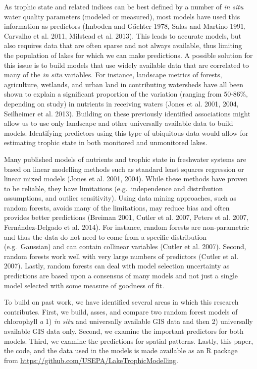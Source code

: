 \documentclass[11pt,]{article}
\begin{document}
As trophic state and related indices can be best defined by a number of
\emph{in situ} water quality parameters (modeled or measured), most
models have used this information as predictors (Imboden and G{ä}chter
1978, Salas and Martino 1991, Carvalho et al. 2011, Milstead et al.
2013). This leads to accurate models, but also requires data that are
often sparse and not always available, thus limiting the population of
lakes for which we can make predictions. A possible solution for this
issue is to build models that use widely available data that are
correlated to many of the \emph{in situ} variables. For instance,
landscape metrics of forests, agriculture, wetlands, and urban land in
contributing watersheds have all been shown to explain a significant
proportion of the variation (ranging from 50-86\%, depending on study)
in nutrients in receiving waters (Jones et al. 2001, 2004, Seilheimer et
al. 2013). Building on these previously identified associations might
allow us to use only landscape and other universally available data to
build models. Identifying predictors using this type of ubiquitous data
would allow for estimating trophic state in both monitored and
unmonitored lakes.

Many published models of nutrients and trophic state in freshwater
systems are based on linear modelling methods such as standard least
squares regression or linear mixed models (Jones et al. 2001, 2004).
While these methods have proven to be reliable, they have limitations
(e.g.~independence and distribution assumptions, and outlier
sensitivity). Using data mining approaches, such as random forests,
avoids many of the limitations, may reduce bias and often provides
better predictions (Breiman 2001, Cutler et al. 2007, Peters et al.
2007, Fernández-Delgado et al. 2014). For instance, random forests are
non-parametric and thus the data do not need to come from a specific
distribution (e.g.~Gaussian) and can contain collinear variables (Cutler
et al. 2007). Second, random forests work well with very large numbers
of predictors (Cutler et al. 2007). Lastly, random forests can deal with
model selection uncertainty as predictions are based upon a consensus of
many models and not just a single model selected with some measure of
goodness of fit.

To build on past work, we have identified several areas in which this
research contributes. First, we build, asses, and compare two random
forest models of chlorophyll \emph{a} 1) \emph{in situ} and universally
available GIS data and then 2) universally available GIS data only.
Second, we examine the important predictors for both models. Third, we
examine the predictions for spatial patterns. Lastly, this paper, the
code, and the data used in the models is made available as an R package
from \url{https://github.com/USEPA/LakeTrophicModelling}.
\end{document}
